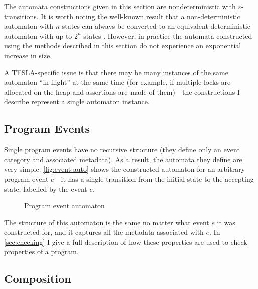 The automata constructions given in this section are nondeterministic with
$\varepsilon$-transitions. It is worth noting the well-known result that a
non-deterministic automaton with $n$ states can always be converted to an
equivalent deterministic automaton with up to $2^n$ states
\cite{rabin_finite_1959}. However, in practice the automata constructed using
the methods described in this section do not experience an exponential increase
in size.

A TESLA-specific issue is that there may be many instances of the same automaton
``in-flight'' at the same time (for example, if multiple locks are allocated on
the heap and assertions are made of them)---the constructions I describe
represent a single automaton instance.

\subsection{Program Events}

Single program events have no recursive structure (they define only an event
category and associated metadata). As a result, the automata they define are
very simple. \autoref{fig:event-auto} shows the constructed automaton for an
arbitrary program event $e$---it has a single transition from the initial state
to the accepting state, labelled by the event $e$.

\begin{figure}
  \centering
  \caption{Program event automaton}
  \label{fig:event-auto}
\end{figure}

The structure of this automaton is the same no matter what event $e$ it was
constructed for, and it captures all the metadata associated with $e$. In
\autoref{sec:checking} I give a full description of how these properties are
used to check properties of a program.

\subsection{Composition}

